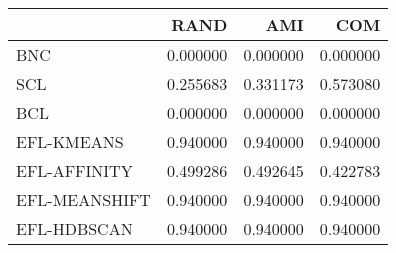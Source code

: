 \begin{tabular}{lrrr}
\toprule
 & RAND & AMI & COM \\
\midrule
BNC & 0.000000 & 0.000000 & 0.000000 \\
SCL & 0.255683 & 0.331173 & 0.573080 \\
BCL & 0.000000 & 0.000000 & 0.000000 \\
EFL-KMEANS & 0.940000 & 0.940000 & 0.940000 \\
EFL-AFFINITY & 0.499286 & 0.492645 & 0.422783 \\
EFL-MEANSHIFT & 0.940000 & 0.940000 & 0.940000 \\
EFL-HDBSCAN & 0.940000 & 0.940000 & 0.940000 \\
\bottomrule
\end{tabular}

